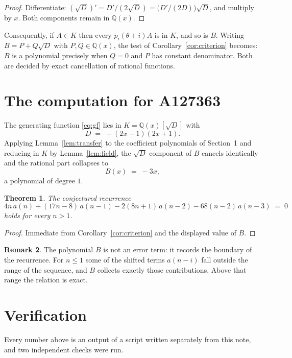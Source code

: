 \documentclass[11pt,a4paper]{article}
\theoremstyle{plain}
\newtheorem{theorem}{Theorem}
\theoremstyle{definition}
\newtheorem{remark}[theorem]{Remark}
\begin{document}
\begin{proof}
Differentiate: $(\sqrt{D})'=D'/(2\sqrt{D})=\bigl(D'/(2D)\bigr)\sqrt{D}$, and multiply by
$x$. Both components remain in $\mathbb{Q}(x)$.
\end{proof}

Consequently, if $A\in K$ then every $p_{i}(\theta+i)A$ is in $K$, and so is $B$. Writing
$B=P+Q\sqrt{D}$ with $P,Q\in\mathbb{Q}(x)$, the test of Corollary~\ref{cor:criterion}
becomes: $B$ is a polynomial precisely when $Q=0$ and $P$ has constant denominator. Both
are decided by exact cancellation of rational functions.

\section{The computation for A127363}

The generating function \eqref{eq:gf} lies in $K=\mathbb{Q}(x)[\sqrt{D}]$ with
\[
D \;=\; - \left(2 x - 1\right) \left(2 x + 1\right) .
\]
Applying Lemma~\ref{lem:transfer} to the coefficient polynomials of Section~1 and reducing
in $K$ by Lemma~\ref{lem:field}, the $\sqrt{D}$ component of $B$ cancels identically and
the rational part collapses to
\[
B(x)\;=\;- 3 x ,
\]
a polynomial of degree $1$.

\begin{theorem}
The conjectured recurrence
\[
4 n\,a(n) + (17 n - 8)\,a(n-1) -  2 \left(8 n + 1\right)\,a(n-2) -  68 \left(n - 2\right)\,a(n-3) \;=\;0
\]
holds for every $n>1$.
\end{theorem}

\begin{proof}
Immediate from Corollary~\ref{cor:criterion} and the displayed value of $B$.
\end{proof}

\begin{remark}
The polynomial $B$ is not an error term: it records the boundary of the recurrence. For
$n\le1$ some of the shifted terms $a(n-i)$ fall outside the range of the sequence,
and $B$ collects exactly those contributions. Above that range the relation is exact.
\end{remark}

\section{Verification}

Every number above is an output of a script written separately from this note, and two
independent checks were run.
\end{document}
